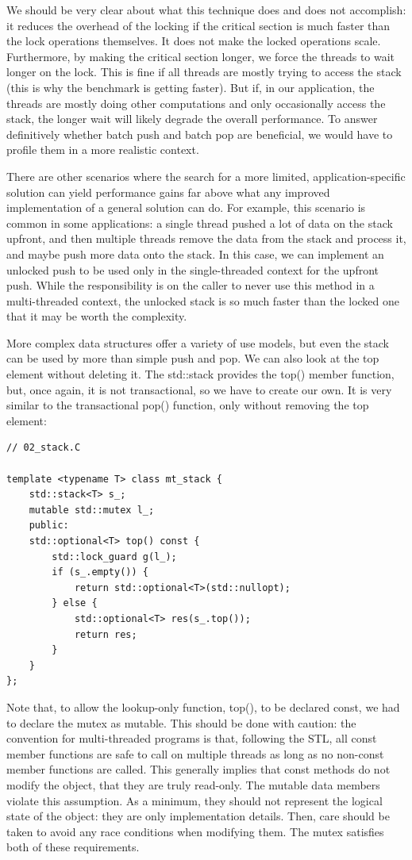 We should be very clear about what this technique does and does not accomplish: it reduces the overhead of the locking if the critical section is much faster than the lock operations themselves. It does not make the locked operations scale. Furthermore, by making the critical section longer, we force the threads to wait longer on the lock. This is fine if all threads are mostly trying to access the stack (this is why the benchmark is getting faster). But if, in our application, the threads are mostly doing other computations and only occasionally access the stack, the longer wait will likely degrade the overall performance. To answer definitively whether batch push and batch pop are beneficial, we would have to profile them in a more realistic context.

There are other scenarios where the search for a more limited, application-specific solution can yield performance gains far above what any improved implementation of a general solution can do. For example, this scenario is common in some applications: a single thread pushed a lot of data on the stack upfront, and then multiple threads remove the data from the stack and process it, and maybe push more data onto the stack. In this case, we can implement an unlocked push to be used only in the single-threaded context for the upfront push. While the responsibility is on the caller to never use this method in a multi-threaded context, the unlocked stack is so much faster than the locked one that it may be worth the complexity.

More complex data structures offer a variety of use models, but even the stack can be used by more than simple push and pop. We can also look at the top element without deleting it. The std::stack provides the top() member function, but, once again, it is not transactional, so we have to create our own. It is very similar to the transactional pop() function, only without removing the top element:

\begin{lstlisting}[style=styleCXX]
// 02_stack.C

template <typename T> class mt_stack {
	std::stack<T> s_;
	mutable std::mutex l_;
	public:
	std::optional<T> top() const {
		std::lock_guard g(l_);
		if (s_.empty()) {
			return std::optional<T>(std::nullopt);
		} else {
			std::optional<T> res(s_.top());
			return res;
		}
	}
};
\end{lstlisting}

Note that, to allow the lookup-only function, top(), to be declared const, we had to declare the mutex as mutable. This should be done with caution: the convention for multi-threaded programs is that, following the STL, all const member functions are safe to call on multiple threads as long as no non-const member functions are called. This generally implies that const methods do not modify the object, that they are truly read-only. The mutable data members violate this assumption. As a minimum, they should not represent the logical state of the object: they are only implementation details. Then, care should be taken to avoid any race conditions when modifying them. The mutex satisfies both of these requirements.

